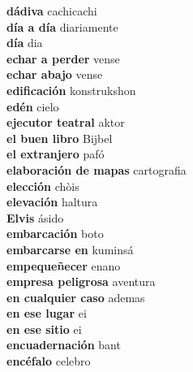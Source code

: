 \textbf{ dádiva  } cachicachi \\
\textbf{ día a día  } diariamente \\
\textbf{ día  } dia \\
\textbf{ echar a perder  } vense \\
\textbf{ echar abajo  } vense \\
\textbf{ edificación  } konstrukshon \\
\textbf{ edén  } cielo \\
\textbf{ ejecutor teatral  } aktor \\
\textbf{ el buen libro  } Bijbel \\
\textbf{ el extranjero  } pafó \\
\textbf{ elaboración de mapas  } cartografia \\
\textbf{ elección  } chòis \\
\textbf{ elevación  } haltura \\
\textbf{ Elvis  } ásido \\
\textbf{ embarcación  } boto \\
\textbf{ embarcarse en  } kuminsá \\
\textbf{ empequeñecer  } enano \\
\textbf{ empresa peligrosa  } aventura \\
\textbf{ en cualquier caso  } ademas \\
\textbf{ en ese lugar  } ei \\
\textbf{ en ese sitio  } ei \\
\textbf{ encuadernación  } bant \\
\textbf{ encéfalo  } celebro \\
